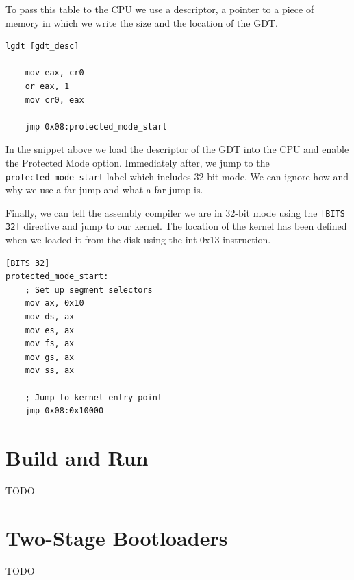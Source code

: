 To pass this table to the CPU we use a descriptor, a pointer to a piece of memory in which we write the size and the 
location of the GDT.

\begin{lstlisting}[caption={Loading GDT and Enabling Protected Mode}]
    lgdt [gdt_desc]
    
    mov eax, cr0
    or eax, 1
    mov cr0, eax

    jmp 0x08:protected_mode_start
\end{lstlisting}

In the snippet above we load the descriptor of the GDT into the CPU and enable the Protected Mode option.
Immediately after, we jump to the \texttt{protected\_mode\_start} label which includes 32 bit mode. We can ignore how and why
we use a far jump and what a far jump is.

Finally, we can tell the assembly compiler we are in 32-bit mode using the \texttt{[BITS 32]} directive and jump
to our kernel. The location of the kernel has been defined when we loaded it from the disk using the int 0x13 instruction.

\begin{lstlisting}[caption={Initializing Registers and Jumping to Kernel}]
[BITS 32]
protected_mode_start:
    ; Set up segment selectors
    mov ax, 0x10
    mov ds, ax
    mov es, ax
    mov fs, ax
    mov gs, ax
    mov ss, ax

    ; Jump to kernel entry point
    jmp 0x08:0x10000
\end{lstlisting}

\section{Build and Run}

TODO


\section{Two-Stage Bootloaders}

TODO

